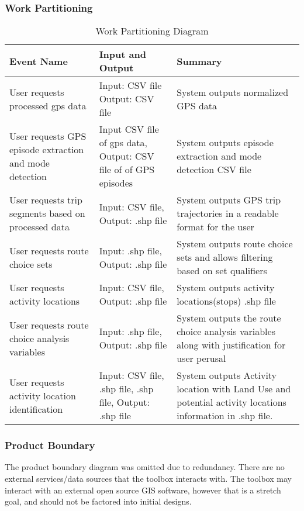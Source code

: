 \documentclass[12pt, titlepage]{article}
\begin{document}
\subsubsection{Work Partitioning}
\begin{table}[H]
    \centering
    \begin{tabular}{|p{4cm}|p{4cm}|p{6cm}|}
         \hline
         Event Name & Input and Output & Summary\\
         \hline
         User requests processed gps data & Input: CSV file Output: CSV file & System outputs normalized GPS data\\
         \hline
         User requests GPS episode extraction and mode detection & Input CSV file of gps data, Output: CSV file of of GPS episodes & System outputs episode extraction and mode detection CSV file\\
         \hline
         User requests trip segments based on processed data & Input: CSV file, Output: .shp file & System outputs GPS trip trajectories in a readable format for the user\\
         \hline
         User requests route choice sets & Input: .shp file, Output: .shp file & System outputs route choice sets and allows filtering based on set qualifiers\\
         \hline
         User requests activity locations  & Input: CSV file, Output: .shp file & System outputs activity locations(stops) .shp file\\
         \hline
         User requests route choice analysis variables  & Input: .shp file, Output: .shp file & System outputs the route choice analysis variables along with justification for user perusal \\
         \hline
          User requests activity location identification  & Input: CSV file, .shp file, .shp file, Output: .shp file& System outputs Activity location with Land Use and potential activity locations information in .shp file. \\
         \hline
    \end{tabular}
    \caption{Work Partitioning Diagram\cite{GISBASED}}
    \label{tab:work_partitioning_diagram}
\end{table}

\subsubsection{Product Boundary}
The product boundary diagram was omitted due to redundancy. There are no external services/data sources that the toolbox interacts with. The toolbox may interact with an external open source GIS software, however that is a stretch goal, and should not be factored into initial designs. 
\end{document}
